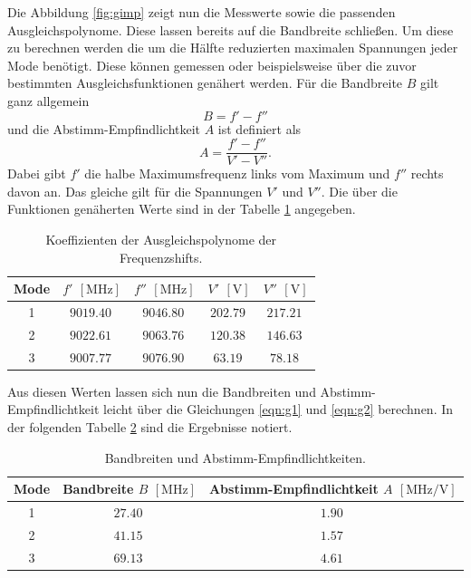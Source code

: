 Die Abbildung \ref{fig:gimp} zeigt nun die Messwerte sowie die passenden Ausgleichspolynome. Diese lassen bereits auf die Bandbreite schließen. Um diese zu berechnen werden die um die Hälfte reduzierten maximalen Spannungen jeder Mode benötigt. Diese können
gemessen oder beispielsweise über die zuvor bestimmten Ausgleichsfunktionen genähert werden. Für die Bandbreite $B$ gilt ganz allgemein
\begin{equation}
    \label{eqn:g1}
B = f' - f''
\end{equation}
und die Abstimm-Empfindlichtkeit $A$ ist definiert als 
\begin{equation}
    \label{eqn:g2}
A = \frac{f' - f''}{V' - V''}.
\end{equation}
Dabei gibt $f'$ die halbe Maximumsfrequenz links vom Maximum und $f''$ rechts davon an. Das gleiche gilt für die Spannungen $V'$ und $V''$.
Die über die Funktionen genäherten Werte sind in der Tabelle \ref{tab:13} angegeben.
\begin{table}
    \centering
    \caption{Koeffizienten der Ausgleichspolynome der Frequenzshifts.} 
    \label{tab:13}
    \begin{tabular}{c || c c | c c}
        \toprule
        Mode &  $f'$ $[\si{\mega\hertz}] $& $f''$ $[\si{\mega\hertz}] $&  $V'$ $[\si{\volt}] $& $V''$ $[\si{\volt}] $ \\
        \midrule
        1      &      $\SI{9019.40}{}$      &       $\SI{9046.80}{}$              &        $\SI{202.79}{}$ &        $\SI{217.21}{}$ \\
        2      &      $\SI{9022.61}{}$      &       $\SI{9063.76}{}$              &        $\SI{120.38}{}$ &        $\SI{146.63}{}$ \\
        3      &      $\SI{9007.77}{}$      &       $\SI{9076.90}{}$              &        $\SI{63.19}{}$ &        $\SI{78.18}{}$ \\
    \end{tabular}
\end{table}
Aus diesen Werten lassen sich nun die Bandbreiten und Abstimm-Empfindlichtkeit leicht über die Gleichungen \ref{eqn:g1} und \ref{eqn:g2} berechnen. In der folgenden Tabelle \ref{tab:111} sind die Ergebnisse notiert.
\begin{table}
    \centering
    \caption{Bandbreiten und Abstimm-Empfindlichtkeiten.} 
    \label{tab:111}
    \begin{tabular}{c | c c}
        \toprule
        Mode &  Bandbreite $B$ $[\si{\mega\hertz}] $& Abstimm-Empfindlichtkeit $A$ $[\si{\mega\hertz\per\volt}]$ \\
        \midrule
        1      &      $\SI{27.40}{}$      &       $\SI{1.90}{}$              \\
        2      &      $\SI{41.15}{}$      &       $\SI{1.57}{}$              \\
        3      &      $\SI{69.13}{}$      &       $\SI{4.61}{}$               \\
    \end{tabular}
\end{table}


